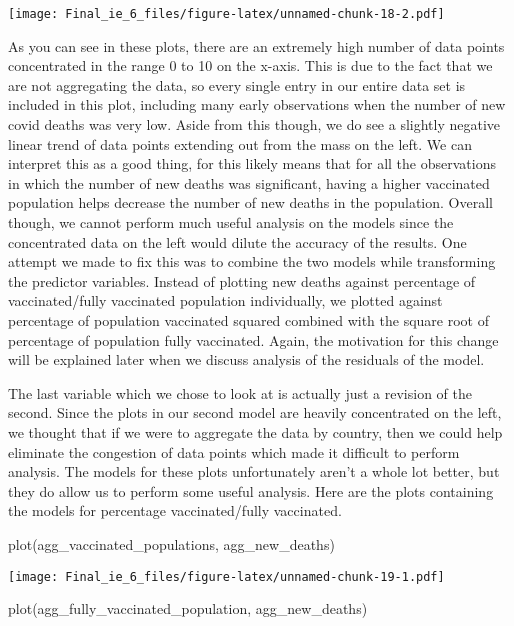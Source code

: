 \documentclass[
  12pt,
]{article}
\newenvironment{Shaded}{\begin{snugshade}}{\end{snugshade}}
\newcommand{\FunctionTok}[1]{\textcolor[rgb]{0.00,0.00,0.00}{#1}}
\newcommand{\NormalTok}[1]{#1}
\begin{document}
\texttt{[image: Final\_ie\_6\_files/figure-latex/unnamed-chunk-18-2.pdf]}

As you can see in these plots, there are an extremely high number of
data points concentrated in the range 0 to 10 on the x-axis. This is due
to the fact that we are not aggregating the data, so every single entry
in our entire data set is included in this plot, including many early
observations when the number of new covid deaths was very low. Aside
from this though, we do see a slightly negative linear trend of data
points extending out from the mass on the left. We can interpret this as
a good thing, for this likely means that for all the observations in
which the number of new deaths was significant, having a higher
vaccinated population helps decrease the number of new deaths in the
population. Overall though, we cannot perform much useful analysis on
the models since the concentrated data on the left would dilute the
accuracy of the results. One attempt we made to fix this was to combine
the two models while transforming the predictor variables. Instead of
plotting new deaths against percentage of vaccinated/fully vaccinated
population individually, we plotted against percentage of population
vaccinated squared combined with the square root of percentage of
population fully vaccinated. Again, the motivation for this change will
be explained later when we discuss analysis of the residuals of the
model.

The last variable which we chose to look at is actually just a revision
of the second. Since the plots in our second model are heavily
concentrated on the left, we thought that if we were to aggregate the
data by country, then we could help eliminate the congestion of data
points which made it difficult to perform analysis. The models for these
plots unfortunately aren't a whole lot better, but they do allow us to
perform some useful analysis. Here are the plots containing the models
for percentage vaccinated/fully vaccinated.

\begin{Shaded}
\begin{Highlighting}[]
\FunctionTok{plot}\NormalTok{(agg\_vaccinated\_populations, agg\_new\_deaths)}
\end{Highlighting}
\end{Shaded}

\texttt{[image: Final\_ie\_6\_files/figure-latex/unnamed-chunk-19-1.pdf]}

\begin{Shaded}
\begin{Highlighting}[]
\FunctionTok{plot}\NormalTok{(agg\_fully\_vaccinated\_population, agg\_new\_deaths)}
\end{Highlighting}
\end{Shaded}
\end{document}
